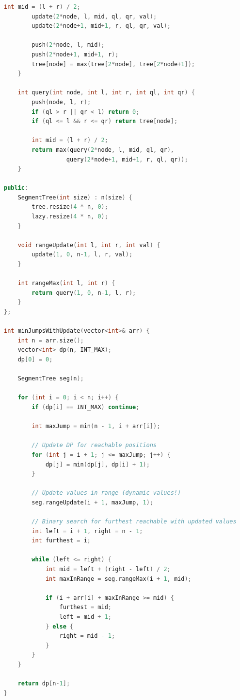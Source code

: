 \documentclass[11pt,a4paper,oneside]{book}
\begin{document}
\begin{lstlisting}[language=C++, caption=ELITE DP+BS Challenges]
        int mid = (l + r) / 2;
        update(2*node, l, mid, ql, qr, val);
        update(2*node+1, mid+1, r, ql, qr, val);
        
        push(2*node, l, mid);
        push(2*node+1, mid+1, r);
        tree[node] = max(tree[2*node], tree[2*node+1]);
    }
    
    int query(int node, int l, int r, int ql, int qr) {
        push(node, l, r);
        if (ql > r || qr < l) return 0;
        if (ql <= l && r <= qr) return tree[node];
        
        int mid = (l + r) / 2;
        return max(query(2*node, l, mid, ql, qr),
                  query(2*node+1, mid+1, r, ql, qr));
    }
    
public:
    SegmentTree(int size) : n(size) {
        tree.resize(4 * n, 0);
        lazy.resize(4 * n, 0);
    }
    
    void rangeUpdate(int l, int r, int val) {
        update(1, 0, n-1, l, r, val);
    }
    
    int rangeMax(int l, int r) {
        return query(1, 0, n-1, l, r);
    }
};

int minJumpsWithUpdate(vector<int>& arr) {
    int n = arr.size();
    vector<int> dp(n, INT_MAX);
    dp[0] = 0;
    
    SegmentTree seg(n);
    
    for (int i = 0; i < n; i++) {
        if (dp[i] == INT_MAX) continue;
        
        int maxJump = min(n - 1, i + arr[i]);
        
        // Update DP for reachable positions
        for (int j = i + 1; j <= maxJump; j++) {
            dp[j] = min(dp[j], dp[i] + 1);
        }
        
        // Update values in range (dynamic values!)
        seg.rangeUpdate(i + 1, maxJump, 1);
        
        // Binary search for furthest reachable with updated values
        int left = i + 1, right = n - 1;
        int furthest = i;
        
        while (left <= right) {
            int mid = left + (right - left) / 2;
            int maxInRange = seg.rangeMax(i + 1, mid);
            
            if (i + arr[i] + maxInRange >= mid) {
                furthest = mid;
                left = mid + 1;
            } else {
                right = mid - 1;
            }
        }
    }
    
    return dp[n-1];
}


\end{lstlisting}
\end{document}

